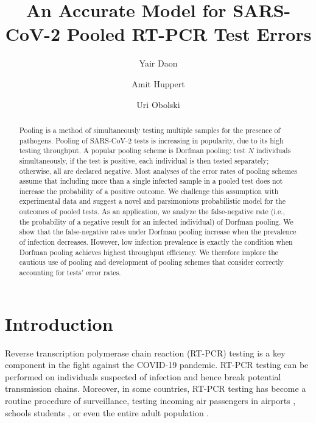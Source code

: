 \documentclass{article}
\begin{document}
\title{An Accurate Model for SARS-CoV-2 Pooled RT-PCR Test Errors}

\author[1,2]{Yair Daon}
\author[1,3,*]{Amit Huppert}
\author[1,2,*]{Uri Obolski}





\date{}

\maketitle

\begin{abstract}
Pooling is a method of simultaneously testing multiple samples for the
presence of pathogens. Pooling of SARS-CoV-2 tests is increasing in
popularity, due to its high testing throughput. A popular pooling
scheme is Dorfman pooling: test $N$ individuals simultaneously, if the
test is positive, each individual is then tested separately;
otherwise, all are declared negative. Most analyses of the error rates
of pooling schemes assume that including more than a single infected
sample in a pooled test does not increase the probability of a
positive outcome. We challenge this assumption with experimental data
and suggest a novel and parsimonious probabilistic model for the
outcomes of pooled tests. As an application, we analyze the
false-negative rate (i.e., the probability of a negative result for an
infected individual) of Dorfman pooling. We show that the
false-negative rates under Dorfman pooling increase when the
prevalence of infection decreases. However, low infection prevalence
is exactly the condition when Dorfman pooling achieves highest
throughput efficiency. We therefore implore the cautious use of
pooling and development of pooling schemes that consider correctly
accounting for tests' error rates.
\end{abstract}
\newpage

\section*{Introduction}
Reverse transcription polymerase chain reaction (RT-PCR) testing is a
key component in the fight against the COVID-19 pandemic. RT-PCR testing can be performed on individuals suspected of infection and hence break potential transmission chains. Moreover, in some countries, RT-PCR testing has become a routine procedure of surveillance, testing incoming air passengers in airports \cite{PoolingAirports, TestingAirportsJapan}, schools students \cite{PoolSchool}, or even the entire adult population \cite{MassPooling}. 
\end{document}

